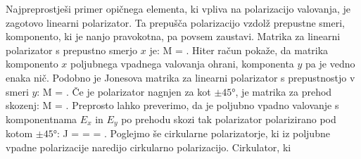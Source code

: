 Najpreprostješi
primer opičnega elementa, ki vpliva na polarizacijo valovanja,
je zagotovo linearni polarizator. Ta prepušča
polarizacijo vzdolž prepustne smeri, komponento, ki
je nanjo pravokotna, pa povsem zaustavi. Matrika za
linearni polarizator s prepustno smerjo $x$ je:
\beq
M = \left[\begin{array}{cc}
1 & 0 \\
0 & 0\\
\end{array}\right]\!\!.
\label{eq:03_481}
\eeq
Hiter račun pokaže, da matrika komponento $x$ poljubnega 
vpadnega valovanja ohrani, komponenta $y$ pa je vedno enaka nič. 
Podobno je Jonesova matrika za linearni polarizator s prepustnostjo
v smeri $y$:
\beq
M = \left[\begin{array}{cc}
0 & 0 \\
0 & 1\\
\end{array}\right]\!\!.
\label{eq:03_49}
\eeq
Če je polarizator nagnjen za kot $\pm45\si{\degree}$, je matrika
za prehod skozenj:
\beq
M = \left[\begin{array}{cc}
1 & \pm 1 \\
\pm 1 & 1\\
\end{array}\right]\!\!.
\label{eq:03_50}
\eeq
Preprosto lahko preverimo, da je poljubno vpadno valovanje s komponentnama
$E_x$ in $E_y$ po prehodu skozi tak polarizator polarizirano 
pod kotom $\pm45\si{\degree}$:
\beq
J = \left[\begin{array}{cc}
1 & \pm 1 \\
\pm 1 & 1\\
\end{array}\right]\cdot 
\left[\begin{array}{c}
J_{1x}\\
J_{1y}\\
\end{array}\right]\!\! = 
\left[\begin{array}{c}
J_{1x} \pm J_{1y}\\
\pm J_{1x} + J_{1y}\\
\end{array}\right]\!\!=
\left[\begin{array}{c}
1\\
\pm 1\\
\end{array}\right]\!\!.
\label{eq:03_51}
\eeq
Poglejmo še cirkularne polarizatorje, ki iz poljubne
vpadne polarizacije naredijo cirkularno polarizacijo. Cirkulator, ki
